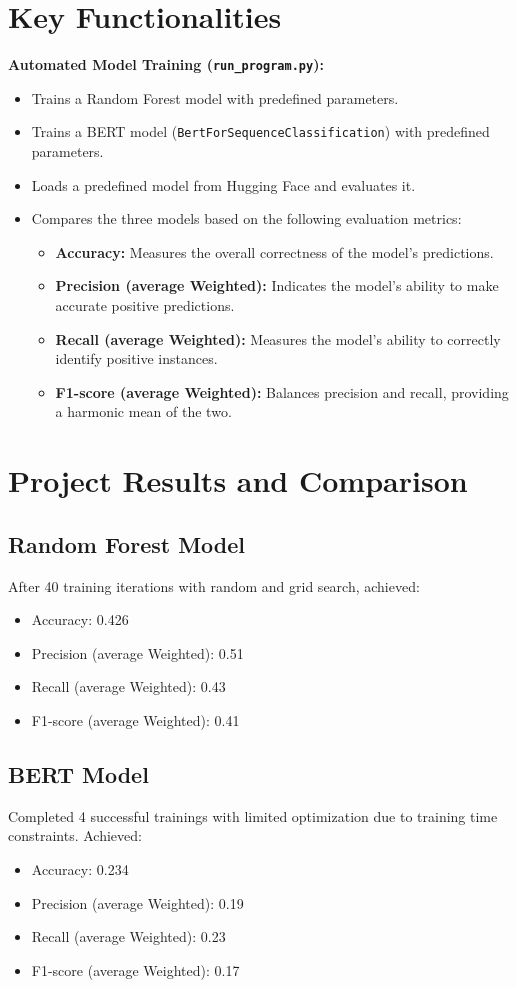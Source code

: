 \documentclass{article}
\begin{document}
\section*{Key Functionalities}
\textbf{Automated Model Training (\texttt{run\_program.py}):}
\begin{itemize}[label=--]
  \item Trains a Random Forest model with predefined parameters.
  \item Trains a BERT model (\texttt{BertForSequenceClassification}) with predefined parameters.
  \item Loads a predefined model from Hugging Face and evaluates it.
  \item Compares the three models based on the following evaluation metrics:
    \begin{itemize}
      \item \textbf{Accuracy:} Measures the overall correctness of the model's predictions.
      \item \textbf{Precision (average Weighted):} Indicates the model's ability to make accurate positive predictions.
      \item \textbf{Recall (average Weighted):} Measures the model's ability to correctly identify positive instances.
      \item \textbf{F1-score (average Weighted):} Balances precision and recall, providing a harmonic mean of the two.
    \end{itemize}
\end{itemize}

\section*{Project Results and Comparison}

\subsection*{Random Forest Model}
After 40 training iterations with random and grid search, achieved:
\begin{itemize}
  \item Accuracy: 0.426
  \item Precision (average Weighted): 0.51
  \item Recall (average Weighted): 0.43
  \item F1-score (average Weighted): 0.41
\end{itemize}

\subsection*{BERT Model}
Completed 4 successful trainings with limited optimization due to training time constraints. Achieved:
\begin{itemize}
  \item Accuracy: 0.234
  \item Precision (average Weighted): 0.19
  \item Recall (average Weighted): 0.23
  \item F1-score (average Weighted): 0.17
\end{itemize}
\end{document}
